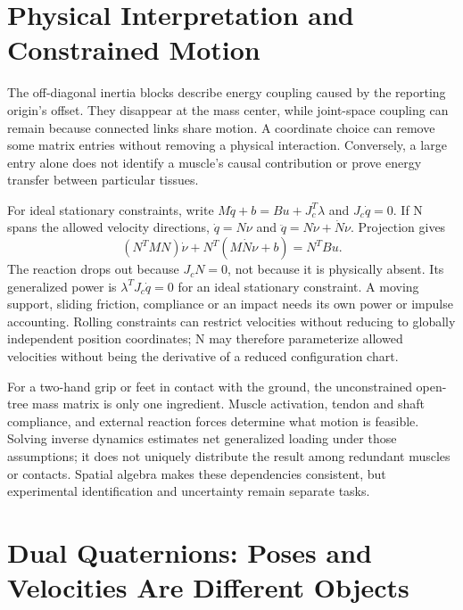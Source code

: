 \section{Physical Interpretation and Constrained Motion}
\label{sec:inertia_interpretation}

The off-diagonal inertia blocks describe energy coupling caused by the reporting origin's offset. They disappear at the mass center, while joint-space coupling can remain because connected links share motion. A coordinate choice can remove some matrix entries without removing a physical interaction. Conversely, a large entry alone does not identify a muscle's causal contribution or prove energy transfer between particular tissues.

For ideal stationary constraints, write $M\ddot q+b=B u+J_c^T\lambda$ and $J_c\dot q=0$. If N spans the allowed velocity directions, $\dot q=N\nu$ and $\ddot q=N\dot\nu+\dot N\nu$. Projection gives
\begin{equation}
(N^TMN)\dot\nu+N^T(M\dot N\nu+b)=N^TB u.
\end{equation}
The reaction drops out because $J_cN=0$, not because it is physically absent. Its generalized power is $\lambda^TJ_c\dot q=0$ for an ideal stationary constraint. A moving support, sliding friction, compliance or an impact needs its own power or impulse accounting. Rolling constraints can restrict velocities without reducing to globally independent position coordinates; N may therefore parameterize allowed velocities without being the derivative of a reduced configuration chart.

For a two-hand grip or feet in contact with the ground, the unconstrained open-tree mass matrix is only one ingredient. Muscle activation, tendon and shaft compliance, and external reaction forces determine what motion is feasible. Solving inverse dynamics estimates net generalized loading under those assumptions; it does not uniquely distribute the result among redundant muscles or contacts. Spatial algebra makes these dependencies consistent, but experimental identification and uncertainty remain separate tasks.

\section[Dual Quaternions: Poses and Velocities Are Different Objects]{Dual Quaternions: Poses and\\Velocities Are Different Objects}
\label{sec:dual_quaternions}

